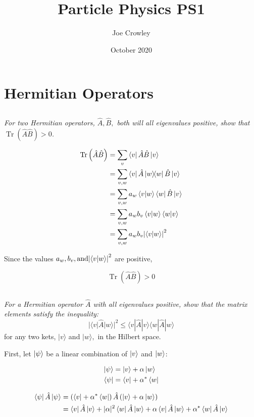 \documentclass[12pt, letterpaper]{article}
\title{Particle Physics PS1}
\author{Joe Crowley}
\date{October 2020}
\begin{document}
  

\section{Hermitian Operators}
\subsection{}
\textit{For two Hermitian operators, $\hat{A}, \hat{B},$ both will all eigenvalues positive, show that $\operatorname{Tr}(\hat{A} \hat{B})>0$. }

\begin{equation*}
\begin{split}
    \operatorname{Tr}\left(\hat{A}\hat{B}\right) &= \sum_v \bra{v}\hat{A}\hat{B}\ket{v}\\
    &= \sum_{v,w} \bra{v}\hat{A}\ketbra{w}\hat{B}\ket{v}\\
    &= \sum_{v,w} a_w\braket{v}{w}\bra{w}\hat{B}\ket{v}\\
    &= \sum_{v,w}  a_w b_v\braket{v}{w}\braket{w}{v}\\
    &= \sum_{v,w}  a_w b_v{\left|\braket{v}{w}\right| }^2
\end{split}
\end{equation*}

Since the values $ a_w, b_v, \text{and} {\left|\braket{v}{w}\right| }^2$ are positive, 

$$
    \operatorname{Tr}\left(\hat{A}\hat{B}\right) >0
$$


\subsection{}
\textit{For a Hermitian operator $\hat{A}$ with all eigenvalues positive, show that the matrix elements satisfy the inequality:}
$$
|\langle v|\hat{A}| w\rangle|^{2} \leq\langle v|\hat{A}| v\rangle\langle w|\hat{A}| w\rangle
$$ for any two kets, $|v\rangle$ and $|w\rangle,$ in the Hilbert space.

First, let $\ket{\psi}$ be a linear combination of $\ket{v}$ and $\ket{w}$:

\begin{align*}
    \ket{\psi} &= \ket{v} +\alpha \ket{w} \\
    \bra{\psi}&= \bra{v} +\alpha^* \bra{w}
\end{align*}

\begin{align*}
    \bra\psi \hat A \ket\psi&= \left(\bra{v} +\alpha^* \bra{w}\right) \hat A \left(\ket{v} +\alpha \ket{w}\right)\\
    & =\bra v\hat{A} \ket v+|\alpha|^{2} \bra w \hat{A}  \ket w + \alpha \bra  v\hat A \ket w+\alpha^{*}\bra w\hat{A} \ket v
\end{align*}
\end{document}
